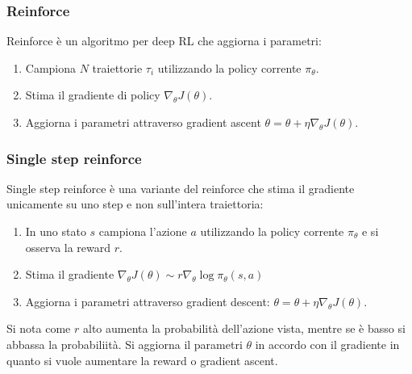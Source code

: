 		\subsubsection{Reinforce}
		Reinforce \`e un algoritmo per deep RL che aggiorna i parametri:
		\begin{enumerate}
			\item Campiona $N$ traiettorie $\tau_i$ utilizzando la policy corrente $\pi_\theta$.
			\item Stima il gradiente di policy $\nabla_\theta J(\theta)$.
			\item Aggiorna i parametri attraverso gradient ascent $\theta = \theta + \eta\nabla_\theta J(\theta)$.
		\end{enumerate}

		\subsubsection{Single step reinforce}
		Single step reinforce \`e una variante del reinforce che stima il gradiente unicamente su uno step e non sull'intera traiettoria:
		\begin{enumerate}
			\item In uno stato $s$ campiona l'azione $a$ utilizzando la policy corrente $\pi_\theta$ e si osserva la reward $r$.
			\item Stima il gradiente $\nabla_\theta J(\theta)\sim r\nabla_\theta\log\pi_\theta(s,a)$
			\item Aggiorna i parametri attraverso gradient descent: $\theta = \theta + \eta\nabla_\theta J(\theta)$.
		\end{enumerate}
		Si nota come $r$ alto aumenta la probabilit\`a dell'azione vista, mentre se \`e basso si abbassa la probabiliit\`a.
		Si aggiorna il parametri $\theta$ in accordo con il gradiente in quanto si vuole aumentare la reward o gradient ascent.
